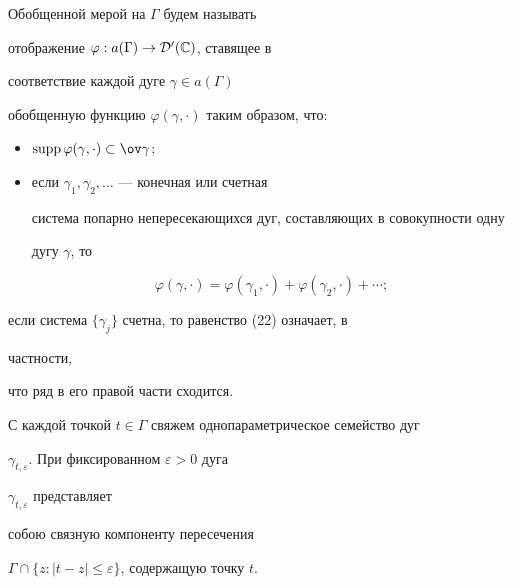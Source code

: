  


\begin{defn} Обобщенной мерой на $\Gamma$ будем называть 


отображение $\varphi:a(\Gamma)\to\cal D'(\Bbb C)$, ставящее в 


соответствие каждой дуге $\gamma\in a(\Gamma)$ 


обобщенную функцию $\varphi(\gamma,\cdot)$ таким образом, что: 


\begin{itemize} 


\item[a)] $\supp\varphi(\gamma,\cdot)\subset\ov\gamma$; 


\item[б)] если $\gamma_1,\gamma_2,\dotsc$ --- конечная или счетная 


система попарно непересекающихся дуг, составляющих в совокупности одну 


дугу $\gamma$, то 


\begin{equation} 


\varphi(\gamma,\cdot)=\varphi(\gamma_1,\cdot)+ 


\varphi(\gamma_2,\cdot)+\dotsb; 


\end{equation} 


\end{itemize} 


если система $\{\gamma_j\}$ счетна, то равенство (22) означает, в 


частности, 


что ряд в его правой части сходится. 


\end{defn} 





С каждой точкой $t\in \Gamma$ свяжем однопараметрическое семейство дуг 


$\gamma_{t,\varepsilon}$. При фиксированном $\varepsilon>0$ дуга 


$\gamma_{t,\varepsilon}$ представляет 


собою связную компоненту пересечения 


$\Gamma\cap\{z:|t-z|\le\varepsilon\}$, содержащую точку $t$. 


 


